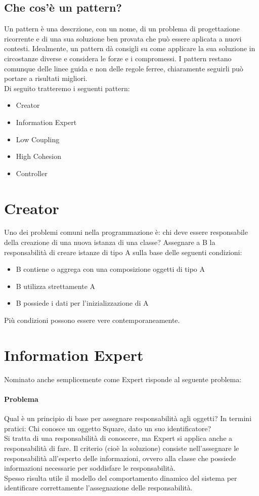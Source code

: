 \subsection*{Che cos'è un pattern?}
Un pattern è una descrzione, con un nome, di un problema di progettazione ricorrente e di
una sua soluzione ben provata che può essere aplicata a nuovi contesti. Idealmente, un
pattern dà consigli su come applicare la sua soluzione in circostanze diverse e considera
le forze e i compromessi. I pattern restano comunque delle linee guida e non delle regole ferree,
chiaramente seguirli può portare a risultati migliori.
\\ Di seguito tratteremo i seguenti pattern:
\begin{itemize}
    \item Creator
    \item Information Expert
    \item Low Coupling
    \item High Cohesion
    \item Controller
\end{itemize}
\section{Creator}
Uno dei problemi comuni nella programmazione è: chi deve essere responsabile della creazione
di una nuova istanza di una classe? Assegnare a B la responsabilità di creare istanze di tipo A
sulla base delle seguenti condizioni:
\begin{itemize}
    \item B contiene o aggrega con una composizione oggetti di tipo A
    \item B utilizza strettamente A
    \item B possiede i dati per l'inizializzazione di A
\end{itemize}
Più condizioni possono essere vere contemporaneamente.
\section{Information Expert}
Nominato anche semplicemente come Expert risponde al seguente problema:
\paragraph*{Problema} Qual è un principio di base per assegnare responsabilità agli oggetti?
In termini pratici: Chi conosce un oggetto Square, dato un suo identificatore?
\\ Si tratta di una responsabilità di conoscere, ma Expert si applica anche a responsabilità
di fare. 
Il criterio (cioè la soluzione) consiste nell'assegnare le responsabilità all'esperto delle informazioni, ovvero
alla classe che possiede informazioni necessarie per soddisfare le responsabilità.
\\ Spesso risulta utile il modello del comportamento dinamico del sistema per identificare
correttamente l'assegnazione delle responsabilità.
